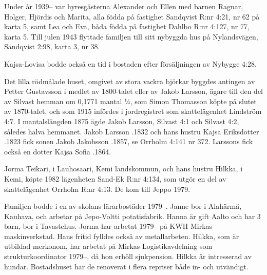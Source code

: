 Under år 1939-- var hyresgästerna Alexander och Ellen  med barnen Ragnar, Holger, Hjördis och Marita, alla födda på fastighet Sandqvist R:nr 4:21, nr 62 på karta 5, samt Lea och Eva, båda födda på fastighet Dahlbo R:nr 4:127, nr 77, karta 5.	Till julen 1943 flyttade familjen till sitt nybyggda hus på Nylandsvägen, Sandqvist 2:98, karta 3, nr 38.

Kajsa-Lovisa  bodde också en tid i bostaden efter försäljningen av Nybygge 4:28.

Det lilla rödmålade huset, omgivet av stora vackra björkar byggdes antingen av Petter Gustavsson i medlet av 1800-talet eller av Jakob Larsson, ägare till den del av Silvast hemman om 0,1771 mantal ¼, som Simon Thomasson köpte på slutet av 1870-talet, och som 1915 infördes i jordregistret som skattelägenhet Lindström 4:7. I mantalslängden 1875 ägde Jakob Larsson, Silvast 4:1 och Silvast 4:2, således halva hemmanet.	Jakob Larsson .1832 och hans hustru Kajsa Eriksdotter .1823 fick sonen Jakob Jakobsson .1857, se Orrholm 	4:141 nr 372. Larssons fick också en dotter Kajsa Sofia .1864.




Jorma Teikari,  i Lauhosaari, Kemi landskommun, och hans 	hustru Hilkka,  i Kemi, köpte 1982 lägenheten Sand-Ek R:nr 4:134, som utgör en del av skattelägenhet Orrholm R:nr 4:13. De kom till Jeppo 1979.
\begin{jhchildren}
  \item {}
  \item {}
\end{jhchildren}
Familjen bodde i en av skolans lärarbostäder 1979--.	Janne bor i Alahärmä, Kauhava, och arbetar på Jepo-Voltti potatisfabrik. Hanna är gift Aalto och har 3 barn, bor i Tavastehus. Jorma har arbetat 1979-- på KWH Mirkas maskinverkstad.	Hans fritid fylldes också av metallarbeten. Hilkka, som är utbildad merkonom, har arbetat på Mirkas Logistikavdelning som strukturkoordinator	1979--, då hon erhöll sjukpension. Hilkka är intresserad av hundar. Bostadshuset har de renoverat i flera repriser både in- och utvändigt.



